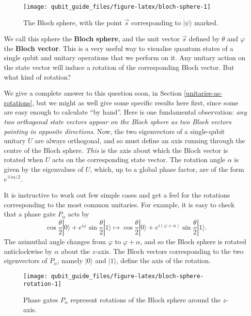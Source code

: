 \documentclass[fleqn]{article}
\begin{document}
\begin{figure}[H]

{\centering \texttt{[image: qubit\_guide\_files/figure-latex/bloch-sphere-1]} 

}

\caption{The Bloch sphere, with the point \(\vec{s}\) corresponding to \(|\psi\rangle\) marked.}\label{fig:bloch-sphere}
\end{figure}

We call this sphere the \textbf{Bloch sphere}, and the unit vector \(\vec{s}\) defined by \(\theta\) and \(\varphi\) the \textbf{Bloch vector}.
This is a very useful way to visualise quantum states of a single qubit and unitary operations that we perform on it.
Any unitary action on the state vector will induce a rotation of the corresponding Bloch vector.
But what kind of rotation?

We give a complete answer to this question soon, in Section \ref{unitaries-as-rotations}, but we might as well give some specific results here first, since some are easy enough to calculate ``by hand''.
Here is one fundamental observation: \emph{any two orthogonal state vectors appear on the Bloch sphere as two Bloch vectors pointing in opposite directions}.
Now, the two eigenvectors of a single-qubit unitary \(U\) are always orthogonal, and so must define an axis running through the centre of the Bloch sphere.
\emph{This} is the axis about which the Bloch vector is rotated when \(U\) acts on the corresponding state vector.
The rotation angle \(\alpha\) is given by the eigenvalues of \(U\), which, up to a global phase factor, are of the form \(e^{\mp i\alpha/2}\).

It is instructive to work out few simple cases and get a feel for the rotations corresponding to the most common unitaries.
For example, it is easy to check that a phase gate \(P_\alpha\) acts by
\[
  \cos\frac{\theta}{2}|0\rangle + e^{i\varphi}\sin\frac{\theta}{2}|1\rangle
  \longmapsto
  \cos\frac{\theta}{2}|0\rangle + e^{i(\varphi+\alpha)}\sin\frac{\theta}{2}|1\rangle.
\]
The azimuthal angle changes from \(\varphi\) to \(\varphi+\alpha\), and so the Bloch sphere is rotated anticlockwise by \(\alpha\) about the \(z\)-axis.
The Bloch vectors corresponding to the two eigenvectors of \(P_\alpha\), namely \(|0\rangle\) and \(|1\rangle\), define the axis of the rotation.



\begin{figure}[H]

{\centering \texttt{[image: qubit\_guide\_files/figure-latex/bloch-sphere-rotation-1]} 

}

\caption{Phase gates \(P_\alpha\) represent rotations of the Bloch sphere around the \(z\)-axis.}\label{fig:bloch-sphere-rotation}
\end{figure}
\end{document}
